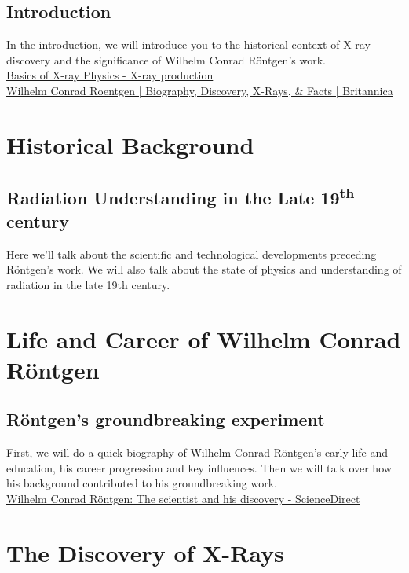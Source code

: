 \documentclass[a4paper,12pt]{report}
\begin{document}
\tableofcontents
{}

\newpage
\section*{Introduction}
In the introduction, we will introduce you to the historical context of X-ray discovery and 
the significance of Wilhelm Conrad Röntgen's work. ~\\


\href{https://radiologymasterclass.co.uk}{Basics of X-ray Physics - X-ray production}\\ 

\href{https://www.britannica.com/biography/Wilhelm-Rontgen}{Wilhelm Conrad Roentgen | Biography, Discovery, X-Rays, \& Facts | Britannica }

\chapter{Historical Background}
\section{Radiation Understanding in the Late 19\textsuperscript{th} century}
  Here we’ll talk about the scientific and technological developments preceding Röntgen's work. We will also talk about the state of physics and understanding of radiation in the late 19th century. 

\chapter{Life and Career of Wilhelm Conrad Röntgen}
\section{Röntgen's groundbreaking experiment}
First, we will do a quick biography of Wilhelm Conrad Röntgen's early life and education, his career progression and key influences. Then we will talk over how his background contributed to his groundbreaking work.\\
\href{https://www.sciencedirect.com/science/article/pii/S1120179720302532}{Wilhelm Conrad Röntgen: The scientist and his discovery - ScienceDirect }

\chapter{The Discovery of X-Rays}
\end{document}
